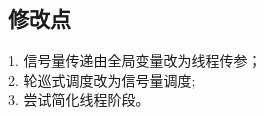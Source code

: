 \documentclass{article}
\begin{document}
\subsection{修改点}
1. 信号量传递由全局变量改为线程传参；\\
2. 轮巡式调度改为信号量调度; \\
3. 尝试简化线程阶段。


\end{document}
